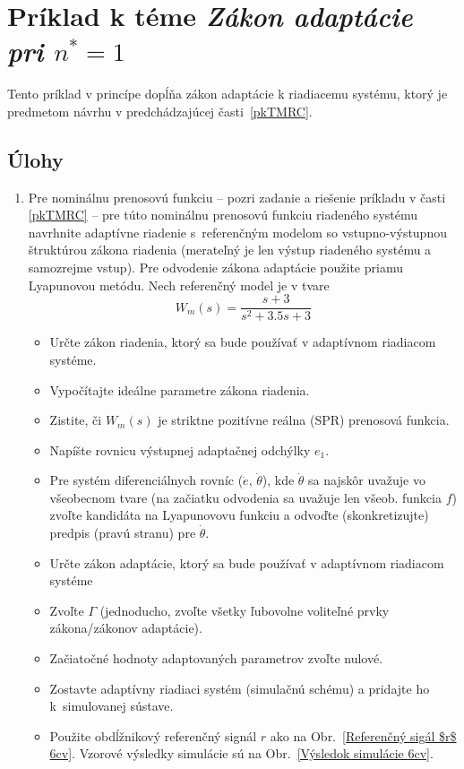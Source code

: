 \documentclass[a4paper, 10pt, ]{article}
\begin{document}
\section{Príklad k téme \emph{Zákon adaptácie pri $n^* = 1$}}




Tento príklad v princípe dopĺňa zákon adaptácie k riadiacemu systému, ktorý je predmetom návrhu v predchádzajúcej časti~\ref{pkTMRC}.



\subsection{Úlohy}


\begin{enumerate}[leftmargin=0pt, labelsep=4mm, itemsep=0pt]



	\item Pre nominálnu prenosovú funkciu -- pozri zadanie a riešenie príkladu v časti \ref{pkTMRC} -- pre túto nominálnu prenosovú funkciu riadeného systému navrhnite adaptívne riadenie s~referenčným modelom so vstupno-výstupnou štruktúrou zákona riadenia (merateľný je len výstup riadeného systému a samozrejme vstup). Pre odvodenie zákona adaptácie použite priamu Lyapunovou metódu. Nech referenčný model je v tvare
	\begin{equation}
		W_m(s) = \frac{s + 3}{ s^2 + 3.5 s + 3}
	\end{equation}

	\begin{itemize}[leftmargin=0pt, labelsep=4mm, itemsep=0pt]
		\item Určte zákon riadenia, ktorý sa bude používať v adaptívnom riadiacom systéme.
		\item Vypočítajte ideálne parametre zákona riadenia.
		\item Zistite, či $W_m(s)$ je striktne pozitívne reálna (SPR) prenosová funkcia.
		\item Napíšte rovnicu výstupnej adaptačnej odchýlky $e_1$.
		\item Pre systém diferenciálnych rovníc ($\dot e$, $\dot \theta$), kde $\dot \theta$ sa najskôr uvažuje vo všeobecnom tvare (na začiatku odvodenia sa uvažuje len všeob. funkcia $f$) zvoľte kandidáta na Lyapunovovu funkciu a odvoďte (skonkretizujte) predpis (pravú stranu) pre $\dot \theta$.
		\item Určte zákon adaptácie, ktorý sa bude používať v adaptívnom riadiacom systéme
		\item Zvoľte $\Gamma$ (jednoducho, zvoľte všetky ľubovolne voliteľné prvky zákona/zákonov adaptácie).
		\item Začiatočné hodnoty adaptovaných parametrov zvoľte nulové.
		\item Zostavte adaptívny riadiaci systém (simulačnú schému) a pridajte ho k~simulovanej sústave.
		\item Použite obdĺžnikový referenčný signál $r$ ako na Obr.~\ref{Referenčný sigál $r$ 6cv}. Vzorové výsledky simulácie sú na Obr.~\ref{Výsledok simulácie 6cv}.
	\end{itemize}

\end{enumerate}
\end{document}
